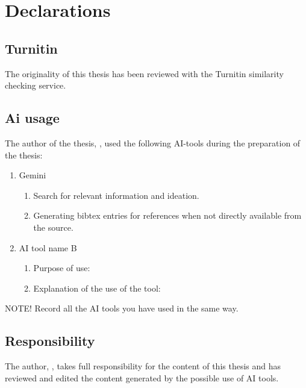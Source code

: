 
{}   %
\section*{Declarations}
\subsection*{Turnitin}
The originality of this thesis has been reviewed with the Turnitin similarity checking service.

\subsection*{Ai usage}
The author of the thesis, \myname, used the following AI-tools during the preparation of the thesis:
\begin{enumerate}
    \item Gemini
    \begin{enumerate}
        \item[a.] Search for relevant information and ideation.
        \item[b.] Generating bibtex entries for references when not directly available from the source. 
    \end{enumerate}
    \item AI tool name B
    \begin{enumerate}
        \item[a.] Purpose of use:
        \item[b.] Explanation of the use of the tool:
    \end{enumerate}
\end{enumerate}

NOTE! Record all the AI tools you have used in the same way.

\subsection*{Responsibility}
The author, \myname, takes full responsibility for the content of this thesis and has reviewed and edited the content generated by the possible use of AI tools.

\clearpage  %
